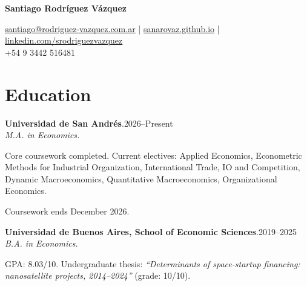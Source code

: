 \documentclass[11pt]{article}
\newcommand{\cvname}{Santiago Rodríguez Vázquez}
\newcommand{\entrydate}[1]{\hfill{\small{#1}}}
\begin{document}
\thispagestyle{firstpage}

{\LARGE\bfseries {\cvname}}

\href{mailto:santiago@rodriguez-vazquez.com.ar}{santiago@rodriguez-vazquez.com.ar} | \href{https://sanarovaz.github.io}{sanarovaz.github.io} | \href{https://linkedin.com/srodriguezvazquez}{linkedin.com/srodriguezvazquez}
\\
+54 9 3442 516481


\section{Education}
\textbf{Universidad de San Andrés}.\entrydate{2026--Present}\\
\textit{M.A. in Economics.}
\begin{cvitems}
  \item Core coursework completed. Current electives:
  Applied Economics,
  Econometric Methods for Industrial Organization,
  International Trade,
  IO and Competition,
  Dynamic Macroeconomics,
  Quantitative Macroeconomics,
  Organizational Economics.
  
  \item Coursework ends December 2026.
\end{cvitems}

\smallskip
\textbf{Universidad de Buenos Aires, School of Economic Sciences}.\entrydate{2019--2025}\\
\textit{B.A. in Economics.}
\begin{cvitems}
  \item GPA: 8.03/10. Undergraduate thesis: \emph{``Determinants of space-startup financing:
        nanosatellite projects, 2014--2024''} (grade: 10/10).
\end{cvitems}

\end{document}
